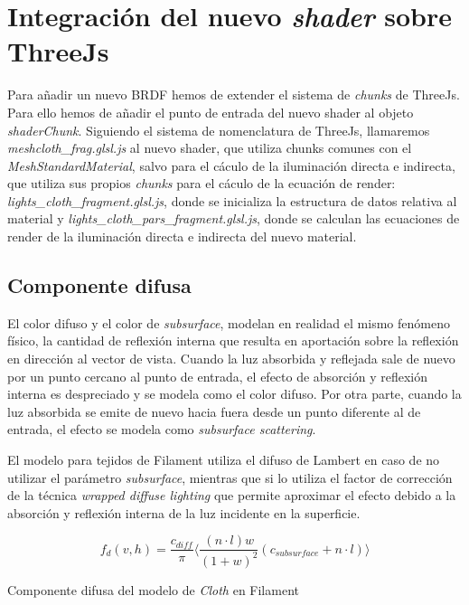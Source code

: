 \vspace{1cm}
\section{Integraci\'on del nuevo \textit{shader} sobre ThreeJs}
  Para a\~nadir un nuevo BRDF hemos de extender el sistema de \textit{chunks} de ThreeJs. Para ello hemos de a\~nadir el
  punto de entrada del nuevo shader al objeto \textit{shaderChunk}. Siguiendo el sistema de nomenclatura de ThreeJs,
  llamaremos \textit{meshcloth\_frag.glsl.js} al nuevo shader, que utiliza chunks comunes con el \textit{MeshStandardMaterial},
  salvo para el c\'aculo de la iluminaci\'on directa e indirecta, que utiliza sus propios \textit{chunks} para el c\'aculo
  de la ecuaci\'on de render: \textit{lights\_cloth\_fragment.glsl.js}, donde se inicializa la estructura de datos relativa
  al material y \textit{lights\_cloth\_pars\_fragment.glsl.js}, donde se calculan las ecuaciones de render de la iluminaci\'on
  directa e indirecta del nuevo material.

  \subsection{Componente difusa}
  El color difuso y el color de \textit{subsurface}, modelan en realidad el mismo fen\'omeno f\'isico, la cantidad de reflexi\'on
  interna que resulta en aportaci\'on sobre la reflexi\'on en direcci\'on al vector de vista. Cuando la luz absorbida y reflejada
  sale de nuevo por un punto cercano al punto de entrada, el efecto de absorci\'on y reflexi\'on interna es despreciado y se modela como el
  color difuso. Por otra parte, cuando la luz absorbida se emite de nuevo hacia fuera desde un punto diferente al de entrada,
  el efecto se modela como \textit{subsurface scattering}.
  
  El modelo para tejidos de Filament utiliza el difuso de Lambert en caso de no utilizar el par\'ametro \textit{subsurface},
  mientras que si lo utiliza el factor de correcci\'on de la t\'ecnica \textit{wrapped diffuse lighting} \autocite{gpugems}
  que permite aproximar el efecto debido a la absorci\'on y reflexi\'on interna de la luz incidente en la superficie.\\

  \begin{eqfloat}[!htb]
    \begin{equation}
      f_d(v, h) = \frac{c_{diff}}{\pi}
      \Bigg\langle
      \frac{(n\cdot{l})w}{(1+ w)^2}( c_{subsurface} + n \cdot{l} )
      \Bigg\rangle
    \end{equation}
  \caption{Componente difusa del modelo de \textit{Cloth} en Filament}
  \end{eqfloat}

